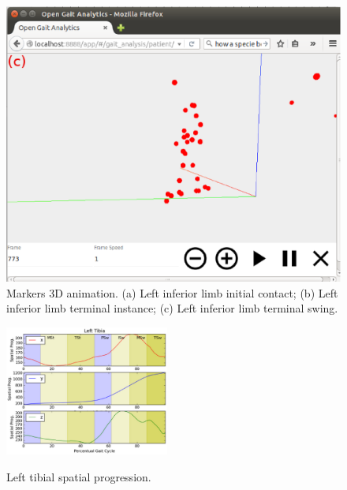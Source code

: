 \documentclass[journal]{IEEEtran}
\begin{document}
\begin{figure}[tb]
\begin{minipage}[b]{0.32\textwidth}
    \includegraphics[width=\textwidth]{./animation3.eps}
  \end{minipage}
  \caption{Markers 3D animation. 
	  (a) Left inferior limb initial contact;
	  (b) Left inferior limb terminal instance;
	  (c) Left inferior limb terminal swing.
  }
  \label{animation}
\end{figure}
\begin{figure}[!t]
	\centering
	{\includegraphics[width=0.48\textwidth]{./spatial_progression.eps}}
	\caption{Left tibial spatial progression.}
	\label{spatial_progression}
\end{figure}
\end{document}
